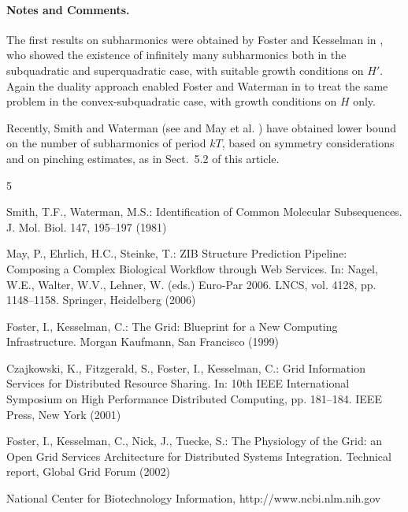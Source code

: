 \documentclass[lnbip]{svmultln}
\begin{document}
\paragraph{Notes and Comments.}
The first results on subharmonics were
obtained by Foster and Kesselman in \cite{fos:kes}, who showed the existence of
infinitely many subharmonics both in the subquadratic and superquadratic
case, with suitable growth conditions on $H'$. Again the duality
approach enabled Foster and Waterman in \cite{fos:kes:2} to treat the
same problem in the convex-subquadratic case, with growth conditions on
$H$ only.

Recently, Smith and Waterman (see \cite{smit:wat} and May et al. \cite{mes})
have obtained lower bound on the number of subharmonics of period $kT$,
based on symmetry considerations and on pinching estimates, as in
Sect.~5.2 of this article.

%
%
\begin{thebibliography}{5}

 Smith, T.F., Waterman, M.S.: Identification of Common Molecular
Subsequences. J. Mol. Biol. 147, 195--197 (1981)

 May, P., Ehrlich, H.C., Steinke, T.: ZIB Structure Prediction Pipeline:
Composing a Complex Biological Workflow through Web Services. In: Nagel,
W.E., Walter, W.V., Lehner, W. (eds.) Euro-Par 2006. LNCS, vol. 4128,
pp. 1148--1158. Springer, Heidelberg (2006)

 Foster, I., Kesselman, C.: The Grid: Blueprint for a New Computing
Infrastructure. Morgan Kaufmann, San Francisco (1999)

 Czajkowski, K., Fitzgerald, S., Foster, I., Kesselman, C.: Grid
Information Services for Distributed Resource Sharing. In: 10th IEEE
International Symposium on High Performance Distributed Computing, pp.
181--184. IEEE Press, New York (2001)

 Foster, I., Kesselman, C., Nick, J., Tuecke, S.: The Physiology of the
Grid: an Open Grid Services Architecture for Distributed Systems
Integration. Technical report, Global Grid Forum (2002)

 National Center for Biotechnology Information, http://www.ncbi.nlm.nih.gov

\end{thebibliography}
%
\end{document}
